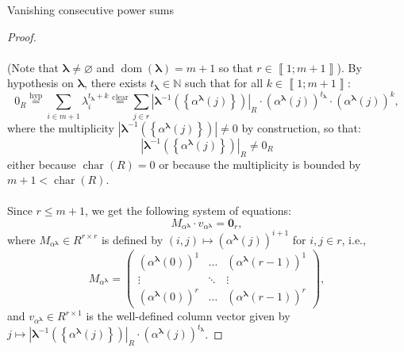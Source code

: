 \begin{appendixitem}{Vanishing consecutive power sums}
\begin{proof}
        \\\\
        (Note that \( \boldsymbol{\lambda} \neq \varnothing \) and \( \operatorname{dom}\left(\boldsymbol{\lambda}\right) = m+1 \) so that \( r \in \left\llbracket 1;m+1 \right\rrbracket \)). By hypothesis on \( \boldsymbol{\lambda} \), there exists \( t_{\boldsymbol{\lambda}} \in \mathbb{N} \) such that for all \( k \in \left\llbracket 1;m+1 \right\rrbracket \):
        \[
            0_{R} \overset{\text{hyp}}{=} \sum_{i \in m+1} \lambda_i^{t_{\boldsymbol{\lambda}}+k} \overset{\text{clear}}{=} \sum_{j \in r} \left|\boldsymbol{\lambda}^{-1}\left(\left\{\alpha^{\boldsymbol{\lambda}}\left(j\right)\right\}\right)\right|_{R} \cdot \left(\alpha^{\boldsymbol{\lambda}}\left(j\right)\right)^{t_{\boldsymbol{\lambda}}} \cdot \left(\alpha^{\boldsymbol{\lambda}}\left(j\right)\right)^k,
        \]
        where the multiplicity \( \left|\boldsymbol{\lambda}^{-1}\left(\left\{\alpha^{\boldsymbol{\lambda}}\left(j\right)\right\}\right)\right| \neq 0 \) by construction, so that:
        \[
            \left|\boldsymbol{\lambda}^{-1}\left(\left\{\alpha^{\boldsymbol{\lambda}}\left(j\right)\right\}\right)\right|_{R} \neq 0_{R}
        \]
        either because \( \operatorname{char}\left(R\right) = 0 \) or because the multiplicity is bounded by \( m+1 < \operatorname{char}\left(R\right) \).
        \\\\
        Since \( r \leq m+1 \), we get the following system of equations:
        \[
            M_{\alpha^{\boldsymbol{\lambda}}} \cdot v_{\alpha^{\boldsymbol{\lambda}}} = \mathbf{0}_{r},
        \]
        where \( M_{\alpha^{\boldsymbol{\lambda}}} \in R^{r \times r} \) is defined by \( \left(i,j\right) \mapsto \left(\alpha^{\boldsymbol{\lambda}}\left(j\right)\right)^{i+1} \) for \( i,j \in r \), i.e.,
        \[
            M_{\alpha^{\boldsymbol{\lambda}}} = \begin{pmatrix}
                \left(\alpha^{\boldsymbol{\lambda}}\left(0\right)\right)^1 & \dots & \left(\alpha^{\boldsymbol{\lambda}}\left(r-1\right)\right)^1 \\
                \vdots & \ddots & \vdots \\
                \left(\alpha^{\boldsymbol{\lambda}}\left(0\right)\right)^r & \dots & \left(\alpha^{\boldsymbol{\lambda}}\left(r-1\right)\right)^r
            \end{pmatrix},
        \]
        and \( v_{\alpha^{\boldsymbol{\lambda}}} \in R^{r \times 1} \) is the well-defined column vector given by \( j \mapsto \left|\boldsymbol{\lambda}^{-1}\left(\left\{\alpha^{\boldsymbol{\lambda}}\left(j\right)\right\}\right)\right|_{R} \cdot \left(\alpha^{\boldsymbol{\lambda}}\left(j\right)\right)^{t_{\boldsymbol{\lambda}}} \).

\end{proof}
\end{appendixitem}
